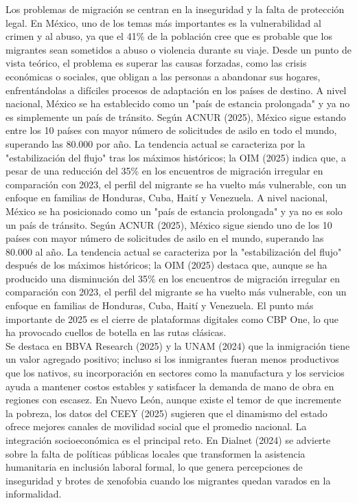\documentclass[12pt]{report}
\begin{document}
Los problemas de migración se centran en la inseguridad y la falta de protección legal.  En México, uno de los temas más importantes es la vulnerabilidad al crimen y al abuso, ya que el 41\% de la población cree que es probable que los migrantes sean sometidos a abuso o violencia durante su viaje.  Desde un punto de vista teórico, el problema es superar las causas forzadas, como las crisis económicas o sociales, que obligan a las personas a abandonar sus hogares, enfrentándolas a difíciles procesos de adaptación en los países de destino.
A nivel nacional, México se ha establecido como un "país de estancia prolongada" y ya no es simplemente un país de tránsito.  Según ACNUR (2025), México sigue estando entre los 10 países con mayor número de solicitudes de asilo en todo el mundo, superando las 80.000 por año.  La tendencia actual se caracteriza por la "estabilización del flujo" tras los máximos históricos; la OIM (2025) indica que, a pesar de una reducción del 35\% en los encuentros de migración irregular en comparación con 2023, el perfil del migrante se ha vuelto más vulnerable, con un enfoque en familias de Honduras, Cuba, Haití y Venezuela.
A nivel nacional, México se ha posicionado como un "país de estancia prolongada" y ya no es solo un país de tránsito.  Según ACNUR (2025), México sigue siendo uno de los 10 países con mayor número de solicitudes de asilo en el mundo, superando las 80.000 al año.  La tendencia actual se caracteriza por la "estabilización del flujo" después de los máximos históricos; la OIM (2025) destaca que, aunque se ha producido una disminución del 35\% en los encuentros de migración irregular en comparación con 2023, el perfil del migrante se ha vuelto más vulnerable, con un enfoque en familias de Honduras, Cuba, Haití y Venezuela.  El punto más importante de 2025 es el cierre de plataformas digitales como CBP One, lo que ha provocado cuellos de botella en las rutas clásicas. \\

Se destaca en BBVA Research (2025) y la UNAM (2024) que la inmigración tiene un valor agregado positivo; incluso si los inmigrantes fueran menos productivos que los nativos, su incorporación en sectores como la manufactura y los servicios ayuda a mantener costos estables y satisfacer la demanda de mano de obra en regiones con escasez. En Nuevo León, aunque existe el temor de que incremente la pobreza, los datos del CEEY (2025) sugieren que el dinamismo del estado ofrece mejores canales de movilidad social que el promedio nacional.
La integración socioeconómica es el principal reto. En Dialnet (2024) se advierte sobre la falta de políticas públicas locales que transformen la asistencia humanitaria en inclusión laboral formal, lo que genera percepciones de inseguridad y brotes de xenofobia cuando los migrantes quedan varados en la informalidad. \\
\end{document}

